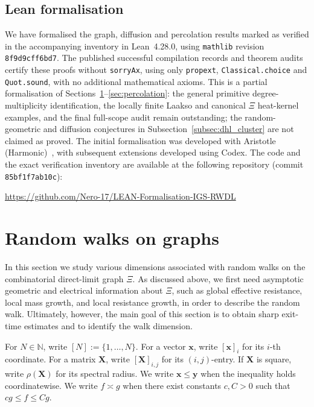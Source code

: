 \documentclass{article}
\theoremstyle{plain}
\theoremstyle{definition}
\begin{document}
\subsection{Lean formalisation}\label{subsec:formalisation}
\begingroup\color{red}
We have formalised the graph, diffusion and percolation results marked as verified in the accompanying inventory in Lean~4.28.0, using \texttt{mathlib} revision \texttt{8f9d9cff6bd7}.
The published successful compilation records and theorem audits certify these proofs without \texttt{sorryAx}, using only \texttt{propext}, \texttt{Classical.choice} and \texttt{Quot.sound}, with no additional mathematical axioms.
This is a partial formalisation of Sections~\ref{sec:random_walks}--\ref{sec:percolation}: the general primitive degree-multiplicity identification, the locally finite Laakso and canonical $\Xi$ heat-kernel examples, and the final full-scope audit remain outstanding; the random-geometric and diffusion conjectures in Subsection~\ref{subsec:dhl_cluster} are not claimed as proved.
The initial formalisation was developed with Aristotle (Harmonic)~\cite{achim2025aristotle}, with subsequent extensions developed using Codex.
The code and the exact verification inventory are available at the following repository (commit \texttt{85bf1f7ab10c}):
\begin{center}
\footnotesize\url{https://github.com/Nero-17/LEAN-Formalisation-IGS-RWDL}
\end{center}
\endgroup

\section{Random walks on graphs}\label{sec:random_walks}

In this section we study various dimensions associated with random walks on the combinatorial direct-limit graph $\Xi$.
As discussed above, we first need asymptotic geometric and electrical information about $\Xi$, such as global effective resistance, local mass growth, and local resistance growth, in order to describe the random walk.
Ultimately, however, the main goal of this section is to obtain sharp exit-time estimates and to identify the walk dimension.

For $N\in\mathbb N$, write $[N]:=\{1,\dots,N\}$.
For a vector $\mathbf x$, write $[\mathbf x]_i$ for its $i$-th coordinate.
For a matrix $\mathbf X$, write $[\mathbf X]_{i,j}$ for its $(i,j)$-entry.
If $\mathbf X$ is square, write $\rho(\mathbf X)$ for its spectral radius.
We write $\mathbf x\le \mathbf y$ when the inequality holds coordinatewise.
We write $f\asymp g$ when there exist constants $c,C>0$ such that $cg\le f\le Cg$.
\end{document}
